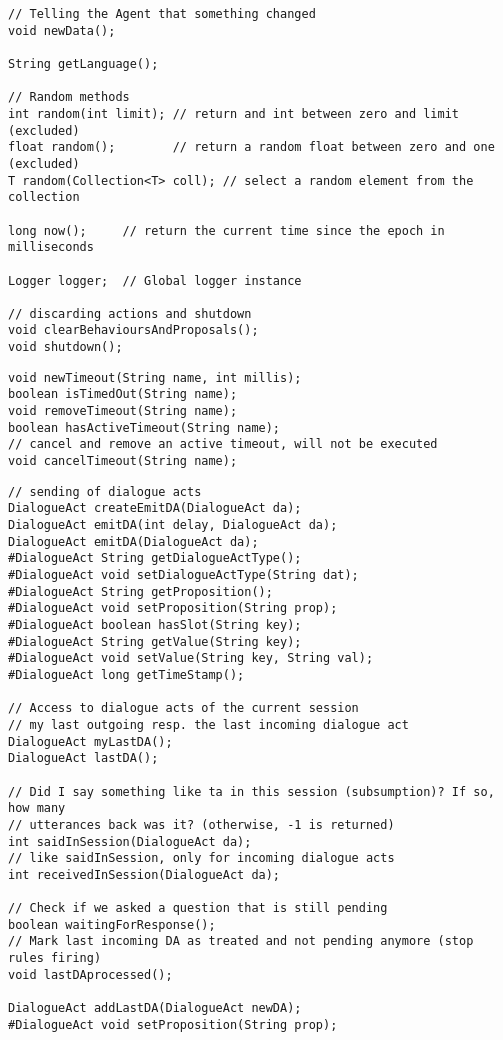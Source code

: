 \begin{small}
\begin{lstlisting}
// Telling the Agent that something changed
void newData();

String getLanguage();

// Random methods
int random(int limit); // return and int between zero and limit (excluded)
float random();        // return a random float between zero and one (excluded)
T random(Collection<T> coll); // select a random element from the collection

long now();     // return the current time since the epoch in milliseconds

Logger logger;  // Global logger instance

// discarding actions and shutdown
void clearBehavioursAndProposals();
void shutdown();
\end{lstlisting}
\end{small}

\begin{small}
\begin{lstlisting}
void newTimeout(String name, int millis);
boolean isTimedOut(String name);
void removeTimeout(String name);
boolean hasActiveTimeout(String name);
// cancel and remove an active timeout, will not be executed
void cancelTimeout(String name);
\end{lstlisting}
\end{small}

\begin{small}
\begin{lstlisting}
// sending of dialogue acts
DialogueAct createEmitDA(DialogueAct da);
DialogueAct emitDA(int delay, DialogueAct da);
DialogueAct emitDA(DialogueAct da);
#DialogueAct String getDialogueActType();
#DialogueAct void setDialogueActType(String dat);
#DialogueAct String getProposition();
#DialogueAct void setProposition(String prop);
#DialogueAct boolean hasSlot(String key);
#DialogueAct String getValue(String key);
#DialogueAct void setValue(String key, String val);
#DialogueAct long getTimeStamp();

// Access to dialogue acts of the current session
// my last outgoing resp. the last incoming dialogue act
DialogueAct myLastDA();
DialogueAct lastDA();

// Did I say something like ta in this session (subsumption)? If so, how many
// utterances back was it? (otherwise, -1 is returned)
int saidInSession(DialogueAct da);
// like saidInSession, only for incoming dialogue acts
int receivedInSession(DialogueAct da);

// Check if we asked a question that is still pending
boolean waitingForResponse();
// Mark last incoming DA as treated and not pending anymore (stop rules firing)
void lastDAprocessed();

DialogueAct addLastDA(DialogueAct newDA);
#DialogueAct void setProposition(String prop);
\end{lstlisting}
\end{small}

